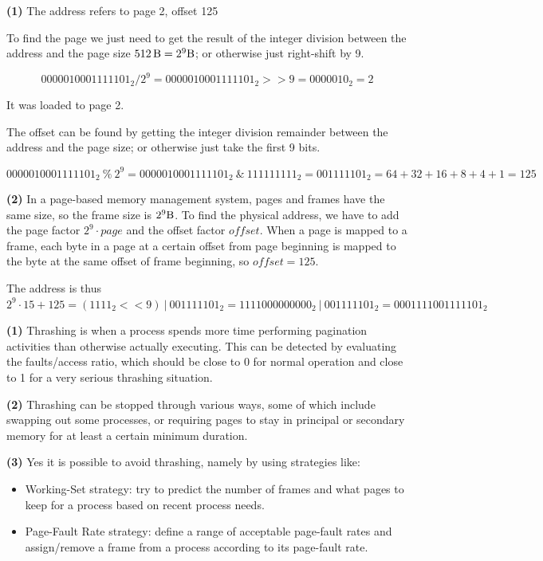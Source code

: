 \documentclass{sope}
\begin{document}
{
\textbf{(1)} The address refers to page 2, offset 125

To find the page we just need to get the result of the integer division between the address and the page size $\SI{512}{\byte}=2^9\SI{}{\byte}$; or otherwise just right-shift by 9.

\begin{equation*}
    0000010001111101_2 / 2^9 = 0000010001111101_2 >> 9 = 0000010_2 = 2
\end{equation*}

It was loaded to page 2.

The offset can be found by getting the integer division remainder between the address and the page size; or otherwise just take the first 9 bits.

\begin{equation*}
    0000010001111101_2~\%~2^9 = 0000010001111101_2~\&~111111111_2 = 001111101_2 = 64+32+16+8+4+1 = 125 
\end{equation*}

\textbf{(2)} In a page-based memory management system, pages and frames have the same size, so the frame size is $2^9\SI{}{\byte}$. To find the physical address, we have to add the page factor $2^9 \cdot page$ and the offset factor $offset$. When a page is mapped to a frame, each byte in a page at a certain offset from page beginning is mapped to the byte at the same offset of frame beginning, so $offset=125$.

The address is thus $2^9 \cdot 15 + 125 = (1111_2 << 9)~|~001111101_2 = 1111000000000_2~|~001111101_2 = 0001111001111101_2 $

\textbf{(1)} Thrashing is when a process spends more time performing pagination activities than otherwise actually executing. This can be detected by evaluating the faults/access ratio, which should be close to 0 for normal operation and close to 1 for a very serious thrashing situation.

\textbf{(2)} Thrashing can be stopped through various ways, some of which include swapping out some processes, or requiring pages to stay in principal or secondary memory for at least a certain minimum duration.

\textbf{(3)} Yes it is possible to avoid thrashing, namely by using strategies like:
\begin{itemize}
    \item Working-Set strategy: try to predict the number of frames and what pages to keep for a process based on recent process needs.
    \item Page-Fault Rate strategy: define a range of acceptable page-fault rates and assign/remove a frame from a process according to its page-fault rate.
\end{itemize}

}
\end{document}
